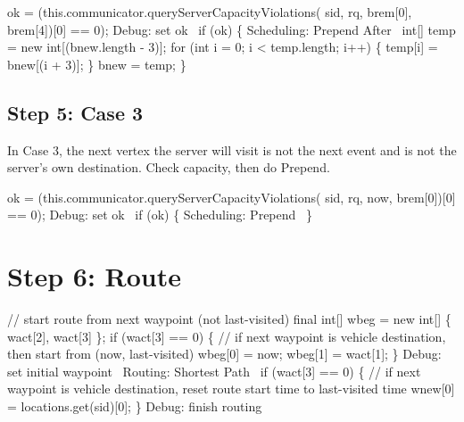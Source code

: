 \nwenddocs{}\endmoddef\nwstartdeflinemarkup{}\nwenddeflinemarkup
ok = (this.communicator.queryServerCapacityViolations(
    sid, rq, brem[0], brem[4])[0] == 0);
\LA{}Debug: set ok~{\nwtagstyle{}}\RA{}
if (ok) \{
  \LA{}Scheduling: Prepend After~{\nwtagstyle{}}\RA{}
  int[] temp = new int[(bnew.length - 3)];
  for (int i = 0; i < temp.length; i++) \{
    temp[i] = bnew[(i + 3)];
  \}
  bnew = temp;
\}
\nwendcode{}\nwdocspar

\subsection{Step 5: Case 3}

In Case 3, the next vertex the server will visit is not the next event and
is not the server's own destination. Check capacity, then do Prepend.

\nwenddocs{}\endmoddef\nwstartdeflinemarkup{}\nwenddeflinemarkup
ok = (this.communicator.queryServerCapacityViolations(
    sid, rq, now, brem[0])[0] == 0);
\LA{}Debug: set ok~{\nwtagstyle{}}\RA{}
if (ok) \{
  \LA{}Scheduling: Prepend~{\nwtagstyle{}}\RA{}
\}
\nwendcode{}\nwdocspar

\section{Step 6: Route}

\nwenddocs{}\endmoddef\nwstartdeflinemarkup{}\nwenddeflinemarkup
// start route from next waypoint (not last-visited)
final int[] wbeg = new int[] \{ wact[2], wact[3] \};
if (wact[3] == 0) \{
  // if next waypoint is vehicle destination, then start from (now, last-visited)
  wbeg[0] = now;
  wbeg[1] = wact[1];
\}
\LA{}Debug: set initial waypoint~{\nwtagstyle{}}\RA{}
\LA{}Routing: Shortest Path~{\nwtagstyle{}}\RA{}
if (wact[3] == 0) \{
  // if next waypoint is vehicle destination, reset route start time to last-visited time
  wnew[0] = locations.get(sid)[0];
\}
\LA{}Debug: finish routing~{\nwtagstyle{}}\RA{}
\nwendcode{}\nwdocspar

